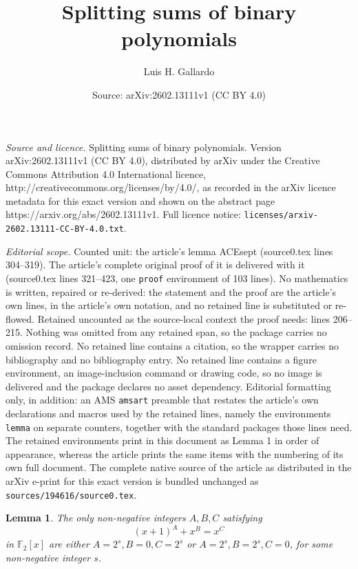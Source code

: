 \documentclass[10pt,a4paper]{amsart}
\title{Splitting sums of binary polynomials}
\author{Luis H. Gallardo}
\date{Source: arXiv:2602.13111v1 (CC BY 4.0)}
\newtheorem{lemma}{Lemma}
\def\F{\mathbb{F}}
\begin{document}
\maketitle

\noindent\emph{Source and licence.} Splitting sums of binary polynomials. Version arXiv:2602.13111v1 (CC BY 4.0), distributed by arXiv under the Creative Commons Attribution 4.0 International licence, http://creativecommons.org/licenses/by/4.0/, as recorded in the arXiv licence metadata for this exact version and shown on the abstract page https://arxiv.org/abs/2602.13111v1. Full licence notice: \texttt{licenses/arxiv-2602.13111-CC-BY-4.0.txt}.\par\smallskip

\noindent\textit{Editorial scope.} Counted unit: the article's lemma ACEsept (source0.tex lines 304--319). The article's complete original proof of it is delivered with it (source0.tex lines 321--423, one \texttt{proof} environment of 103 lines). No mathematics is written, repaired or re-derived: the statement and the proof are the article's own lines, in the article's own notation, and no retained line is substituted or re-flowed.  Retained uncounted as the source-local context the proof needs: lines 206--215.  Nothing was omitted from any retained span, so the package carries no omission record.  No retained line contains a citation, so the wrapper carries no bibliography and no bibliography entry.  No retained line contains a figure environment, an image-inclusion command or drawing code, so no image is delivered and the package declares no asset dependency.  Editorial formatting only, in addition: an AMS \texttt{amsart} preamble that restates the article's own declarations and macros used by the retained lines, namely the environments \texttt{lemma} on separate counters, together with the standard packages those lines need.  The retained environments print in this document as Lemma 1 in order of appearance, whereas the article prints the same items with the numbering of its own full document.  The complete native source of the article as distributed in the arXiv e-print for this exact version is bundled unchanged as \texttt{sources/194616/source0.tex}.
\begin{lemma}
\label{ABC}
The only non-negative integers \( A, B, C \) satisfying
\begin{equation}
\label{xabc}
(x+1)^A + x^B = x^C
\end{equation}
in \( \F_2[x] \)
are either \( A = 2^s, B = 0, C = 2^s \) or \( A = 2^s, B = 2^s, C = 0 \), for some non-negative integer \( s \).
\end{lemma}
\end{document}
